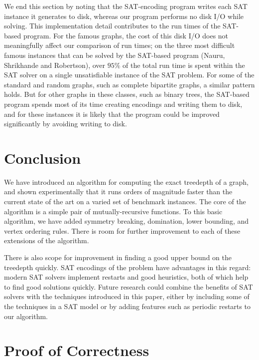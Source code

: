 {    We end this section by noting that the SAT-encoding program writes each SAT
    instance it generates to disk, whereas our program performs no disk I/O while
    solving.  This implementation detail contributes to the run times of the
    SAT-based program.  For the famous graphs, the cost of this disk I/O
    does not meaningfully affect our comparison of run times; on
    the three most difficult famous instances that can be solved by the SAT-based
    program (Nauru, Shrikhande and Robertson), over $95\%$ of the total run time is
    spent within the SAT solver on a single unsatisfiable instance of the SAT
    problem.  For some of the standard and random graphs, such as complete
    bipartite graphs, a similar pattern holds.  But for other graphs in these
    classes, such as binary trees, the SAT-based program spends most of its time
    creating encodings and writing them to disk, and for these instances it
    is likely that the program could be improved significantly by
    avoiding writing to disk.

    \section{Conclusion} \label{sec:conclusion}

    We have introduced an algorithm for computing the exact treedepth of a graph, and shown
    experimentally that it runs orders of magnitude faster than the current state of the art
    on a varied set of benchmark instances.  The core of the algorithm is a
    simple pair of mutually-recursive functions.
    To this basic algorithm, we have added symmetry breaking, domination,
    lower bounding, and vertex ordering rules.  There is room for further
    improvement to each of these extensions of the algorithm.

    There is also scope for improvement in finding a good upper bound on the treedepth
    quickly.
    SAT encodings of the problem have advantages in this regard:
    modern SAT solvers implement restarts and good heuristics, both of which help to find
    good solutions quickly.  Future research could combine the benefits of SAT solvers with
    the techniques introduced in this paper, either by including some of the techniques
    in a SAT model or by adding features such as periodic restarts to our algorithm.

    \appendix
    \section{Proof of Correctness} \label{appendix:proof}

}
